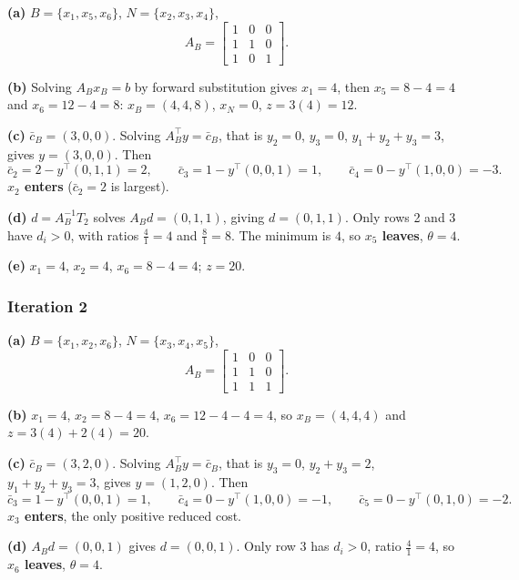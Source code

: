 \documentclass[11pt]{article}
\theoremstyle{definition}
\theoremstyle{plain}
\begin{document}
\textbf{(a)} $B = \{x_1, x_5, x_6\}$, $N = \{x_2, x_3, x_4\}$,
\[
  A_B = \begin{bmatrix} 1 & 0 & 0 \\ 1 & 1 & 0 \\ 1 & 0 & 1
        \end{bmatrix}.
\]

\textbf{(b)} Solving $A_B x_B = b$ by forward substitution gives
$x_1 = 4$, then $x_5 = 8 - 4 = 4$ and $x_6 = 12 - 4 = 8$:
$x_B = (4,4,8)$, $x_N = 0$, $z = 3(4) = 12$.

\textbf{(c)} $\bar{c}_B = (3,0,0)$. Solving $A_B^{\!\top} y = \bar{c}_B$,
that is
$y_2 = 0$, $y_3 = 0$, $y_1 + y_2 + y_3 = 3$, gives $y = (3,0,0)$. Then
\[
  \bar{c}_2 = 2 - y^{\!\top}(0,1,1) = 2, \qquad
  \bar{c}_3 = 1 - y^{\!\top}(0,0,1) = 1, \qquad
  \bar{c}_4 = 0 - y^{\!\top}(1,0,0) = -3 .
\]
\textbf{$x_2$ enters} ($\bar{c}_2 = 2$ is largest).

\textbf{(d)} $d = A_B^{-1}T_2$ solves $A_B d = (0,1,1)$, giving
$d = (0,1,1)$. Only rows 2 and 3 have $d_i > 0$, with ratios
$\tfrac41 = 4$ and $\tfrac81 = 8$. The minimum is $4$, so
\textbf{$x_5$ leaves}, $\theta = 4$.

\textbf{(e)} $x_1 = 4$, $x_2 = 4$, $x_6 = 8 - 4 = 4$; $z = 20$.

\subsubsection*{Iteration 2}

\textbf{(a)} $B = \{x_1, x_2, x_6\}$, $N = \{x_3, x_4, x_5\}$,
\[
  A_B = \begin{bmatrix} 1 & 0 & 0 \\ 1 & 1 & 0 \\ 1 & 1 & 1
        \end{bmatrix}.
\]

\textbf{(b)} $x_1 = 4$, $x_2 = 8-4 = 4$, $x_6 = 12-4-4 = 4$, so
$x_B = (4,4,4)$ and $z = 3(4) + 2(4) = 20$.

\textbf{(c)} $\bar{c}_B = (3,2,0)$. Solving $A_B^{\!\top}y = \bar{c}_B$,
that is $y_3 = 0$, $y_2 + y_3 = 2$, $y_1 + y_2 + y_3 = 3$, gives
$y = (1,2,0)$. Then
\[
  \bar{c}_3 = 1 - y^{\!\top}(0,0,1) = 1, \qquad
  \bar{c}_4 = 0 - y^{\!\top}(1,0,0) = -1, \qquad
  \bar{c}_5 = 0 - y^{\!\top}(0,1,0) = -2 .
\]
\textbf{$x_3$ enters}, the only positive reduced cost.

\textbf{(d)} $A_B d = (0,0,1)$ gives $d = (0,0,1)$. Only row 3 has
$d_i > 0$, ratio $\tfrac41 = 4$, so \textbf{$x_6$ leaves},
$\theta = 4$.
\end{document}
